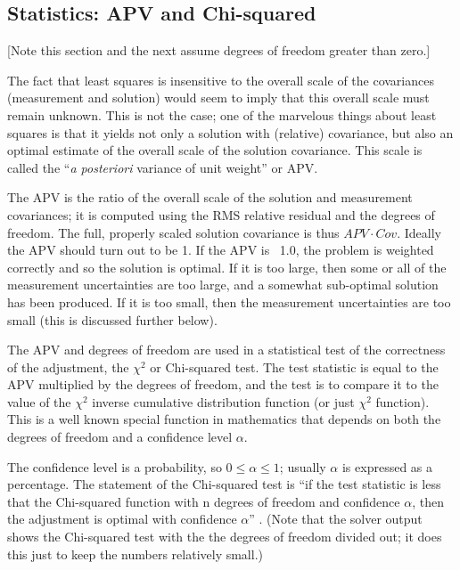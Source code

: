 \subsection{Statistics: APV and Chi-squared}
[Note this section and the next assume degrees of freedom greater than zero.]

The fact that least squares is insensitive to the overall scale of the covariances (measurement and solution) would seem to imply that this overall scale must remain unknown. This is not the case; one of the marvelous things about least squares is that it yields not only a solution with (relative) covariance, but also an optimal estimate of the overall scale of the solution covariance. This scale is called the ``\emph{a posteriori} variance of unit weight'' or APV.

The APV is the ratio of the overall scale of the solution and measurement covariances; it is computed using the RMS relative residual and the degrees of freedom. The full, properly scaled solution covariance is thus $APV \cdot Cov$. Ideally the APV should turn out to be 1. If the APV is ~1.0, the problem is weighted correctly and so the solution is optimal. If it is too large, then some or all of the measurement uncertainties are too large, and a somewhat sub-optimal solution has been produced. If it is too small, then the measurement uncertainties are too small (this is discussed further below).

The APV and degrees of freedom are used in a statistical test of the correctness of the adjustment, the $\chi^2$ or Chi-squared test. The test statistic is equal to the APV multiplied by the degrees of freedom, and the test is to compare it to the value of the $\chi^2$ inverse cumulative distribution \cite{NIST} function (or just $\chi^2$ function). This is a well known special function in mathematics \cite{ghilani} \cite{abramowitz} \cite{NIST} that depends on both the degrees of freedom and a confidence level $\alpha$.

The confidence level is a probability, so $0 \leq \alpha \leq 1$; usually $\alpha$ is expressed as a percentage. The statement of the Chi-squared test is ``if the test statistic is less that the Chi-squared function with n degrees of freedom and confidence $\alpha$, then the adjustment is optimal with confidence $\alpha$'' \cite{ghilani} \cite{leick}. (Note that the solver output shows the Chi-squared test with the the degrees of freedom divided out; it does this just to keep the numbers relatively small.)

